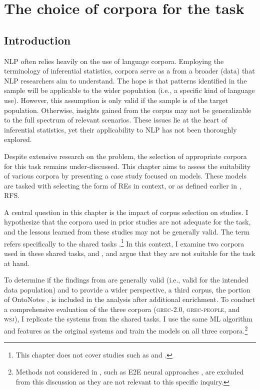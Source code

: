 \chapter{The choice of corpora for the \context task}\label{chap4}

\section{Introduction}

NLP often relies heavily on the use of language corpora. Employing the terminology of inferential statistics, corpora serve as a  from a broader (data)  that NLP researchers aim to understand. The hope is that patterns identified in the sample will be applicable to the wider population (i.e., a specific kind of language use). However, this assumption is only valid if the sample is  of the target population. Otherwise, insights gained from the corpus may not be generalizable to the full spectrum of relevant scenarios. These issues lie at the heart of inferential statistics, yet their applicability to NLP has not been thoroughly explored.

Despite extensive research on the \context problem, the selection of appropriate corpora for this task remains under-discussed. This chapter aims to assess the suitability of various corpora by presenting a case study focused on \context models. These models are tasked with selecting the form of REs in context, or as defined earlier in , RFS.

A central question in this chapter is the impact of corpus selection on \context studies. I hypothesize that the corpora used in prior \context studies are not adequate for the task, and the lessons learned from these studies may not be generally valid. The term  refers specifically to the \grec shared tasks \citep{belz2010generating}.\footnote{This chapter does not cover studies such as \citet{kibrik2016referential} and \citet{castro-ferreira-etal-2016-towards-variation}.} In this context, I examine two corpora used in these shared tasks, \grectwo and \grecp, and argue that they are not suitable for the task at hand.

To determine if the findings from \grec are generally valid (i.e., valid for the intended data population) and to provide a wider perspective, a third corpus, the \wsj portion of OntoNotes \citep{hovy-etal-2006-ontonotes, weischedel2013ontonotes}, is included in the analysis after additional enrichment. To conduct a comprehensive evaluation of the three corpora (\textsc{grec-2.0}, \textsc{grec-people}, and \textsc{wsj}), I replicate the systems from the \grec shared tasks. I use the same ML algorithm and features as the original systems and train the models on all three corpora.\footnote{Methods not considered in \grec, such as E2E neural approaches \citep{ferreira2018neuralreg,cao2019referring,cunha-etal-2020-referring}, are excluded from this discussion as they are not relevant to this specific inquiry.}

